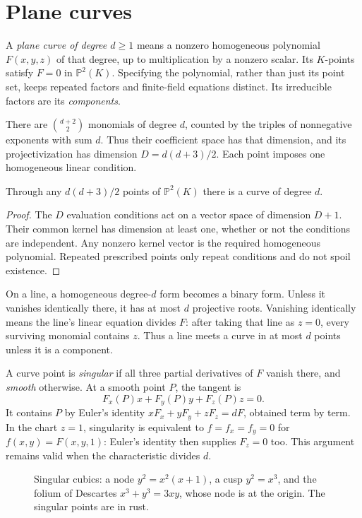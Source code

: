 \section{Plane curves}

A \emph{plane curve of degree $d\ge1$} means a nonzero homogeneous polynomial $F(x,y,z)$ of that degree, up to multiplication by a nonzero scalar. Its $K$-points satisfy $F=0$ in $\mathbb P^2(K)$. Specifying the polynomial, rather than just its point set, keeps repeated factors and finite-field equations distinct. Its irreducible factors are its \emph{components}.

There are $\binom{d+2}{2}$ monomials of degree $d$, counted by the triples of nonnegative exponents with sum $d$. Thus their coefficient space has that dimension, and its projectivization has dimension $D=d(d+3)/2$. Each point imposes one homogeneous linear condition.

\begin{proposition}\label{geometry:prop:dimcurves}
Through any $d(d+3)/2$ points of $\mathbb P^2(K)$ there is a curve of degree $d$.
\end{proposition}
\begin{proof}
The $D$ evaluation conditions act on a vector space of dimension $D+1$. Their common kernel has dimension at least one, whether or not the conditions are independent. Any nonzero kernel vector is the required homogeneous polynomial. Repeated prescribed points only repeat conditions and do not spoil existence.
\end{proof}

On a line, a homogeneous degree-$d$ form becomes a binary form. Unless it vanishes identically there, it has at most $d$ projective roots. Vanishing identically means the line's linear equation divides $F$: after taking that line as $z=0$, every surviving monomial contains $z$. Thus a line meets a curve in at most $d$ points unless it is a component.

A curve point is \emph{singular} if all three partial derivatives of $F$ vanish there, and \emph{smooth} otherwise. At a smooth point $P$, the tangent is
\[
F_x(P)x+F_y(P)y+F_z(P)z=0.
\]
It contains $P$ by Euler's identity $xF_x+yF_y+zF_z=dF$, obtained term by term. In the chart $z=1$, singularity is equivalent to $f=f_x=f_y=0$ for $f(x,y)=F(x,y,1)$: Euler's identity then supplies $F_z=0$ too. This argument remains valid when the characteristic divides $d$.

\begin{figure}[ht]
\centering
{}
\caption{Singular cubics: a node $y^2=x^2(x+1)$, a cusp $y^2=x^3$, and the folium of Descartes $x^3+y^3=3xy$, whose node is at the origin. The singular
points are in rust.}
\label{geometry:fig:singular}
\end{figure}


